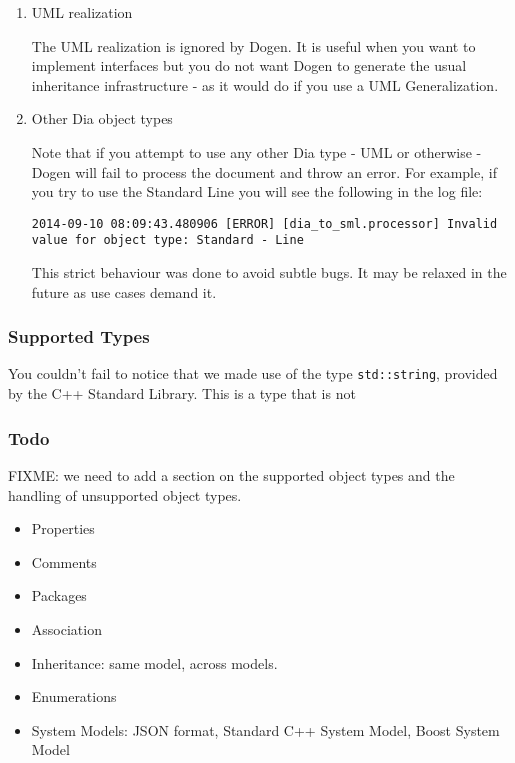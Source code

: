 \documentclass[11pt]{article}
\begin{document}
\begin{enumerate}
\item UML realization
\label{sec-3-4-2-7}

The UML realization is ignored by Dogen. It is useful when you want to
implement interfaces but you do not want Dogen to generate the usual
inheritance infrastructure - as it would do if you use a UML
Generalization.

\item Other Dia object types
\label{sec-3-4-2-8}

Note that if you attempt to use any other Dia type - UML or
otherwise - Dogen will fail to process the document and throw an
error. For example, if you try to use the Standard Line you will see
the following in the log file:

\begin{verbatim}
2014-09-10 08:09:43.480906 [ERROR] [dia_to_sml.processor] Invalid value for object type: Standard - Line
\end{verbatim}

This strict behaviour was done to avoid subtle bugs. It may be relaxed
in the future as use cases demand it.
\end{enumerate}

\subsubsection{Supported Types}
\label{sec-3-4-3}

You couldn't fail to notice that we made use of the type
\texttt{std::string}, provided by the C++ Standard Library. This is a type
that is not

\subsubsection{Todo}
\label{sec-3-4-4}

FIXME: we need to add a section on the supported object types and the
handling of unsupported object types.


\begin{itemize}
\item Properties
\item Comments
\item Packages
\item Association
\item Inheritance: same model, across models.
\item Enumerations
\item System Models: JSON format, Standard C++ System Model, Boost System Model
\end{itemize}
\end{document}
